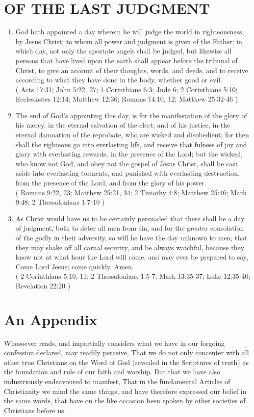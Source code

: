 \documentclass[12pt,a4paper]{book}
\begin{document}
\chapter{OF THE LAST JUDGMENT}
\label{ch-las-jud}
\begin{enumerate}
\item
\label{ch-las-jud-1}
God hath appointed a day wherein he will judge the world in righteousness, by Jesus Christ; to whom all power and judgment is given of the Father; in which day, not only the apostate angels shall be judged, but likewise all persons that have lived upon the earth shall appear before the tribunal of Christ, to give an account of their thoughts, words, and deeds, and to receive according to what they have done in the body, whether good or evil.\\
( Acts 17:31; John 5:22, 27; 1 Corinthians 6:3; Jude 6; 2 Corinthians 5:10; Ecclesiastes 12:14; Matthew 12:36; Romans 14:10, 12; Matthew 25:32-46 )
\item
\label{ch-las-jud-2}
The end of God's appointing this day, is for the manifestation of the glory of his mercy, in the eternal salvation of the elect; and of his justice, in the eternal damnation of the reprobate, who are wicked and disobedient; for then shall the righteous go into everlasting life, and receive that fulness of joy and glory with everlasting rewards, in the presence of the Lord; but the wicked, who know not God, and obey not the gospel of Jesus Christ, shall be cast aside into everlasting torments, and punished with everlasting destruction, from the presence of the Lord, and from the glory of his power.\\
( Romans 9:22, 23; Matthew 25:21, 34; 2 Timothy 4:8; Matthew 25:46; Mark 9:48; 2 Thessalonians 1:7-10 )
\item
\label{ch-las-jud-3}
As Christ would have us to be certainly persuaded that there shall be a day of judgment, both to deter all men from sin, and for the greater consolation of the godly in their adversity, so will he have the day unknown to men, that they may shake off all carnal security, and be always watchful, because they know not at what hour the Lord will come, and may ever be prepared to say, Come Lord Jesus; come quickly. Amen.\\
( 2 Corinthians 5:10, 11; 2 Thessalonians 1:5-7; Mark 13:35-37; Luke 12:35-40; Revelation 22:20 )
\end{enumerate}

\backmatter
\chapter{An Appendix}
Whosoever reads, and impartially considers what we have in our forgoing confession declared, may readily perceive, That we do not only concenter with all other true Christians on the Word of God (revealed in the Scriptures of truth) as the foundation and rule of our faith and worship. But that we have also industriously endeavoured to manifest, That in the fundamental Articles of Christianity we mind the same things, and have therefore expressed our belief in the same words, that have on the like occasion been spoken by other societies of Christians before us.
\end{document}
